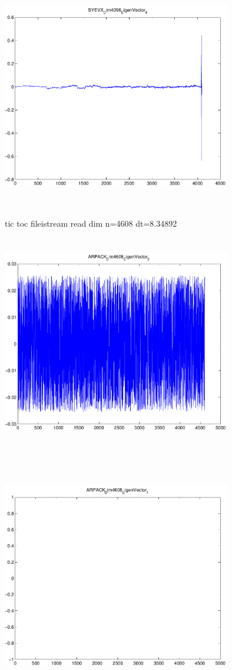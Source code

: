 \documentclass[9pt]{article}
\theoremstyle{plain}
\theoremstyle{definition}
\theoremstyle{remark}
\numberwithin{equation}{section}
\begin{document}
\includegraphics[width=10.0cm,height=10.0cm]{SYEVX_Dim4096_EigenVector_4.pdf}

tic toc fileistream read dim n=4608 dt=8.34892
\includegraphics[width=10.0cm,height=10.0cm]{ARPACK_Dim4608_EigenVector_0.pdf}

\includegraphics[width=10.0cm,height=10.0cm]{ARPACK_Dim4608_EigenVector_1.pdf}
\end{document}
